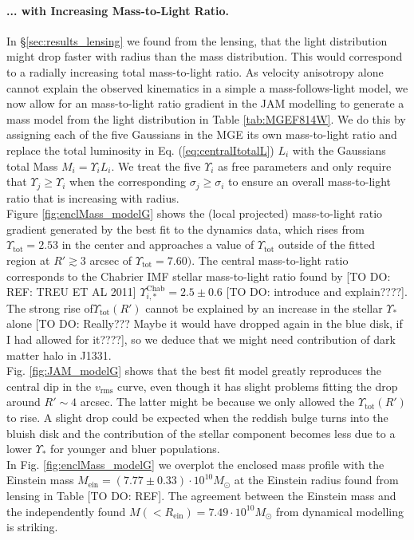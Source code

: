 \paragraph{... with Increasing Mass-to-Light Ratio.} In \S\ref{sec:results_lensing} we found from the lensing, that the light distribution might drop faster with radius than the mass distribution. This would correspond to a radially increasing total mass-to-light ratio. As velocity anisotropy alone cannot explain the observed kinematics in a simple a mass-follows-light model, we now allow for an mass-to-light ratio gradient in the JAM modelling to generate a mass model from the light distribution in Table \ref{tab:MGEF814W}. We do this by assigning each of the five Gaussians in the MGE its own mass-to-light ratio and replace the total luminosity in Eq. (\ref{eq:centralItotalL}) $L_i$ with the Gaussians total Mass $M_i = \Upsilon_{i} L_i$. We treat the five $\Upsilon_i$ as free parameters and only require that $\Upsilon_{j} \geq \Upsilon_i$ when the corresponding $\sigma_j \geq \sigma_i$ to ensure an overall mass-to-light ratio that is increasing with radius.
\\Figure \ref{fig:enclMass_modelG} shows the (local projected) mass-to-light ratio gradient generated by the best fit to the dynamics data, which rises from $\Upsilon_\text{tot} = 2.53$ in the center and approaches a value of $\Upsilon_\text{tot}$ outside of the fitted region at $R'\gtrsim 3$ arcsec of $\Upsilon_\text{tot} = 7.60)$. The central mass-to-light ratio corresponds to the Chabrier IMF stellar mass-to-light ratio found by [TO DO: REF: TREU ET AL 2011] $\Upsilon_{i,*}^\text{Chab} = 2.5 \pm 0.6$ [TO DO: introduce and explain????]. The strong rise  of$\Upsilon_\text{tot}(R')$ cannot be explained by an increase in the stellar $\Upsilon_*$ alone [TO DO: Really??? Maybe it would have dropped again in the blue disk, if I had allowed for it????], so we deduce that we might need  contribution of dark matter halo in J1331.
\\Fig. \ref{fig:JAM_modelG} shows that the best fit model greatly reproduces the central dip in the $v_\text{rms}$ curve, even though it has slight problems fitting the drop around $R' \sim 4$ arcsec. The latter might be because we only allowed the $\Upsilon_\text{tot}(R')$ to rise. A slight drop could be expected when the reddish bulge turns into the bluish disk and the contribution of the stellar component becomes less due to a lower $\Upsilon_{*}$ for younger and bluer populations.
\\In Fig. \ref{fig:enclMass_modelG} we overplot the enclosed mass profile with the Einstein mass $M_\text{ein} = (7.77 \pm 0.33) \cdot 10^{10} M_\odot$ at the Einstein radius found from lensing in Table [TO DO: REF]. The agreement between the Einstein mass and the independently found $M(<R_\text{ein}) = 7.49 \cdot 10^{10} M_\odot$ from dynamical modelling is striking.


